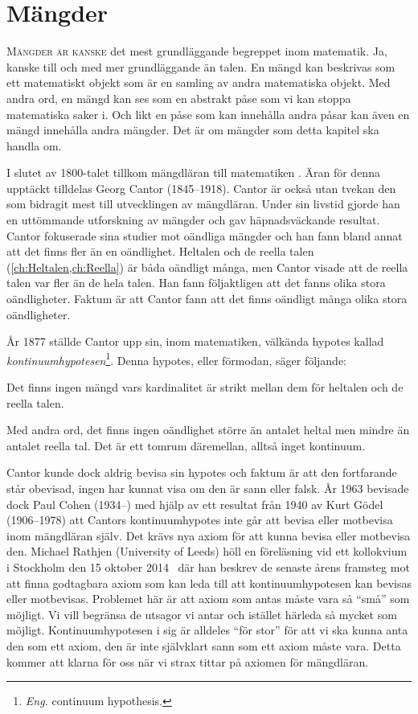\chapter{Mängder}
\label{ch:Mangder}%
\lettrine{M}{ängder är kanske} det mest grundläggande begreppet inom matematik.
Ja, kanske till och med mer grundläggande än talen.
En mängd kan beskrivas som ett matematiskt objekt som är en samling av andra
matematiska objekt.
Med andra ord, en mängd kan ses som en abstrakt påse som vi kan stoppa
matematiska saker i.
Och likt en påse som kan innehålla andra påsar kan även en mängd
innehålla andra mängder.
Det är om mängder som detta kapitel ska handla om.

I slutet av 1800-talet tillkom mängdläran till matematiken 
\cite{Kline1990mtf3}.
Äran för denna upptäckt tilldelas Georg Cantor (1845--1918).
Cantor är också utan tvekan den som bidragit mest till utvecklingen av
mängdläran.
Under sin livstid gjorde han en uttömmande utforskning av mängder och gav
häpnadsväckande resultat.
Cantor fokuserade sina studier mot oändliga mängder och han fann bland annat
att det finns fler än en oändlighet.
Heltalen och de reella talen (\cref{ch:Heltalen,ch:Reella}) är båda oändligt 
många, men Cantor visade att de reella talen var fler än de hela talen.
Han fann följaktligen att det fanns olika stora oändligheter.
Faktum är att Cantor fann att det finns oändligt många olika stora 
oändligheter.

År 1877 ställde Cantor upp sin, inom matematiken, välkända hypotes kallad
\emph{kontinuumhypotesen}\footnote{\emph{Eng.} continuum hypothesis.}.
Denna hypotes, eller förmodan, säger följande:
\begin{conjecture}[Kontinuumhypotesen]\label{Kontinuumhypotesen}
  Det finns ingen mängd vars kardinalitet är strikt mellan dem för heltalen
  och de reella talen.
\end{conjecture}
Med andra ord, det finns ingen oändlighet större än antalet heltal men mindre
än antalet reella tal.
Det är ett tomrum däremellan, alltså inget kontinuum.

Cantor kunde dock aldrig bevisa sin hypotes och faktum är att den fortfarande 
står obevisad, ingen har kunnat visa om den är sann eller falsk.
År 1963 bevisade dock Paul Cohen (1934--) med hjälp av ett resultat från 1940 
av Kurt Gödel (1906--1978) att Cantors kontinuumhypotes inte går att bevisa 
eller motbevisa inom mängdläran själv.
Det krävs nya axiom för att kunna bevisa eller motbevisa den.
Michael Rathjen (University of Leeds) höll en föreläsning vid ett kollokvium 
i Stockholm den 15 oktober 2014~\cite{smcrathjen} där han beskrev de senaste 
årens framsteg mot att finna godtagbara axiom som kan leda till att 
kontinuumhypotesen kan bevisas eller motbevisas.
Problemet här är att axiom som antas måste vara så \enquote{små} som möjligt.  
Vi vill begränsa de utsagor vi antar och istället härleda så mycket som 
möjligt.
Kontinuumhypotesen i sig är alldeles \enquote{för stor} för att vi ska kunna 
anta den som ett axiom, den är inte självklart sann som ett axiom måste vara.
Detta kommer att klarna för oss när vi strax tittar på axiomen för mängdläran.



